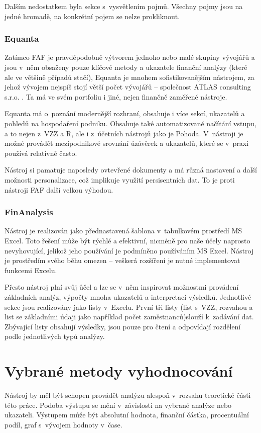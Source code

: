 Dalším nedostatkem byla sekce s~vysvětlením pojmů. Všechny pojmy jsou na jedné hromadě, na konkrétní pojem se nelze prokliknout.


\subsubsection{Equanta}
Zatímco FAF je pravděpodobně výtvorem jednoho nebo malé skupiny vývojářů a jsou v~něm obsaženy pouze klíčové metody a ukazatele finanční analýzy (které ale ve většině případů stačí), Equanta je mnohem sofistikovanějším nástrojem, za jehož vývojem nejspíš stojí větší počet vývojářů -- společnost ATLAS consulting s.r.o. . Ta má ve svém portfoliu i jiné, nejen finančně zaměřené nástroje.

Equanta má o~poznání modernější rozhraní, obsahuje i více sekcí, ukazatelů a pohledů na hospodaření podniku. Obsahuje také automatizované načítání vstupu, a to nejen z~VZZ a R, ale i z~účetních nástrojů jako je Pohoda. V~nástroji je možné provádět mezipodnikové srovnání úzávěrek a ukazatelů, které se v~praxi používá relativně často.

Nástroj si pamatuje naposledy ovtevřené dokumenty a má různá nastavení a další možnosti personalizace, což implikuje využití persisentních dat. To je proti nástroji FAF další velkou výhodou. 


\subsubsection{FinAnalysis}
Nástroj je realizován jako přednastavená šablona v~tabulkovém prostředí MS Excel. Toto řešení může být rýchlé a efektivní, nicméně pro naše účely naprosto nevyhovující, jelikož jeho používání je podmíněno používáním MS Excel. Nástroj je prostředím svého běhu omezen -- veškerá rozšíření je nutné implementovat funkcemi Excelu.

Přesto nástroj plní svůj ůčel a lze se v~něm inspirovat možnostmi provádení základních analýz, výpočty mnoha ukazatelů a interpretací výsledků. Jednotlivé sekce jsou realizovány jako listy v~Excelu. První tři listy (list s~VZZ, rozvahou a list se základními údaji jako například počet zaměstnanců)slouží k~zadávání dat. Zbývající listy obsahují výsledky, jsou pouze pro čtení a odpovídají rozdělení podle jednotlivých typů analýzy.



\section{Vybrané metody vyhodnocování}
Nástroj by měl být schopen provádět analýzu alespoň v~rozsahu teoretické části této práce. Podoba výstupu se mění v~závislosti na vybrané analýze nebo ukazateli. Výstupem může být absolutní hodnota, finanční částka, procentuální podíl, graf s~vývojem hodnoty v~čase. 


